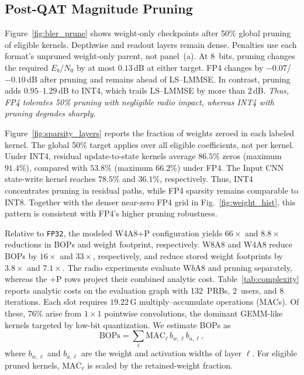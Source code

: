 \vspace{-2mm}

\subsection{Post-QAT Magnitude Pruning}
\label{sec:res_prune}
Figure~\ref{fig:bler_prune} shows weight-only checkpoints after 50\%
global pruning of eligible kernels. Depthwise and readout layers
remain dense. Penalties use each format's unpruned
weight-only parent, not panel~(a). At 8~bits, pruning changes the
required $E_b/N_0$ by at most $0.13$\,dB at either target. FP4 changes
by $-0.07$/$-0.10$\,dB after pruning and remains ahead of LS--\gls{LMMSE}.
In contrast, pruning adds $0.95$--$1.29$\,dB to INT4, which trails
LS--\gls{LMMSE} by more than $2$\,dB. \emph{Thus, FP4 tolerates 50\% pruning
with negligible radio impact, whereas INT4 with pruning degrades sharply.}

Figure~\ref{fig:sparsity_layers} reports the fraction of weights
zeroed in each labeled kernel. The global 50\% target applies over all
eligible coefficients, not per kernel. Under INT4, residual
update-to-state kernels average $86.5\%$ zeros (maximum $91.4\%$),
compared with $53.8\%$ (maximum $66.2\%$) under FP4. The Input CNN
state-write kernel reaches $78.5\%$ and $36.1\%$, respectively. Thus,
INT4 concentrates pruning in residual paths, while FP4 sparsity
remains comparable to INT8. Together with the denser near-zero FP4
grid in Fig.~\ref{fig:weight_hist}, this pattern is consistent with
FP4's higher pruning robustness.

Relative to \texttt{FP32}, the modeled W4A8+P configuration yields
$66\times$ and $8.8\times$ reductions in \glspl{BOP} and weight
footprint, respectively. W8A8 and W4A8 reduce \glspl{BOP} by
$16\times$ and $33\times$, respectively, and reduce stored weight
footprints by $3.8\times$ and $7.1\times$. The radio experiments
evaluate W$b$A8 and pruning separately, whereas the +P rows project
their combined analytic cost. Table~\ref{tab:complexity} reports
analytic costs on the evaluation graph with 132~\glspl{PRB}, 2~users,
and 8 iterations. Each slot requires $19.22$\,G multiply--accumulate
operations (MACs). Of these, $76\%$ arise from $1{\times}1$ pointwise
convolutions, the dominant GEMM-like kernels targeted by low-bit
quantization. We estimate \glspl{BOP} as
\[
  \mathrm{BOPs}
  = \sum_{\ell}\mathrm{MAC}_{\ell}\,b_{w,\ell}b_{a,\ell},
\]
where $b_{w,\ell}$ and $b_{a,\ell}$ are the weight and activation
widths of layer $\ell$. For eligible pruned kernels,
$\mathrm{MAC}_{\ell}$ is scaled by the retained-weight fraction.